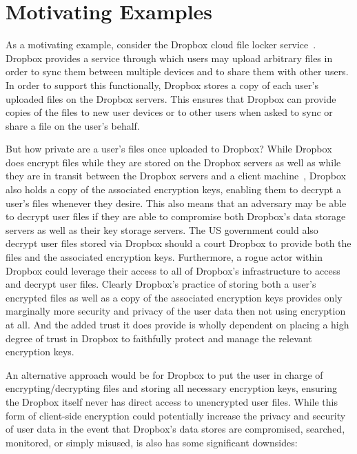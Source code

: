\section{Motivating Examples}
\label{chap:intro:example}

As a motivating example, consider the Dropbox cloud file locker
service~\cite{dropbox}. Dropbox provides a service through which users
may upload arbitrary files in order to sync them between multiple
devices and to share them with other users. In order to support this
functionally, Dropbox stores a copy of each user's uploaded files on
the Dropbox servers. This ensures that Dropbox can provide copies of
the files to new user devices or to other users when asked to sync or
share a file on the user's behalf.

But how private are a user's files once uploaded to Dropbox? While
Dropbox does encrypt files while they are stored on the Dropbox
servers as well as while they are in transit between the Dropbox
servers and a client machine~\cite{dropbox-security}, Dropbox also
holds a copy of the associated encryption keys, enabling them to
decrypt a user's files whenever they desire. This also means that an
adversary may be able to decrypt user files if they are able to
compromise both Dropbox's data storage servers as well as their key
storage servers. The US government could also decrypt user files
stored via Dropbox should a court Dropbox to provide both the files
and the associated encryption keys. Furthermore, a rogue actor within
Dropbox could leverage their access to all of Dropbox's infrastructure
to access and decrypt user files. Clearly Dropbox's practice of
storing both a user's encrypted files as well as a copy of the
associated encryption keys provides only marginally more security and
privacy of the user data then not using encryption at all. And the
added trust it does provide is wholly dependent on placing a high
degree of trust in Dropbox to faithfully protect and manage the
relevant encryption keys.

An alternative approach would be for Dropbox to put the user in charge
of encrypting/decrypting files and storing all necessary encryption
keys, ensuring the Dropbox itself never has direct access to
unencrypted user files. While this form of client-side encryption
could potentially increase the privacy and security of user data in
the event that Dropbox's data stores are compromised, searched,
monitored, or simply misused, is also has some significant downsides:

